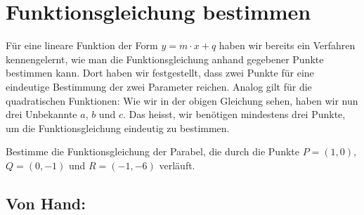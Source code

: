 \documentclass[11pt,oneside]{article}
\begin{document}
\newpage
\section{Funktionsgleichung bestimmen}
	Für eine lineare Funktion der Form $y=m\cdot x+q$ haben wir bereits ein Verfahren kennengelernt, wie man die Funktionsgleichung anhand gegebener Punkte bestimmen kann. Dort haben wir festgestellt, dass zwei Punkte für eine eindeutige Bestimmung der zwei Parameter reichen. Analog gilt für die quadratischen Funktionen:\vspace{11pt}\newline
	\vspace{11pt}\newline
	Wie wir in der obigen Gleichung sehen, haben wir nun drei Unbekannte $a$, $b$ und $c$. Das heisst, wir benötigen mindestens drei Punkte, um die Funktionsgleichung eindeutig zu bestimmen.
	\begin{beispiel}
		Bestimme die Funktionsgleichung der Parabel, die durch die Punkte $P=(1,0)$, $Q=(0,-1)$ und $R=(-1,-6)$ verläuft.
	\end{beispiel}
	\subsection*{Von Hand:}
\end{document}

